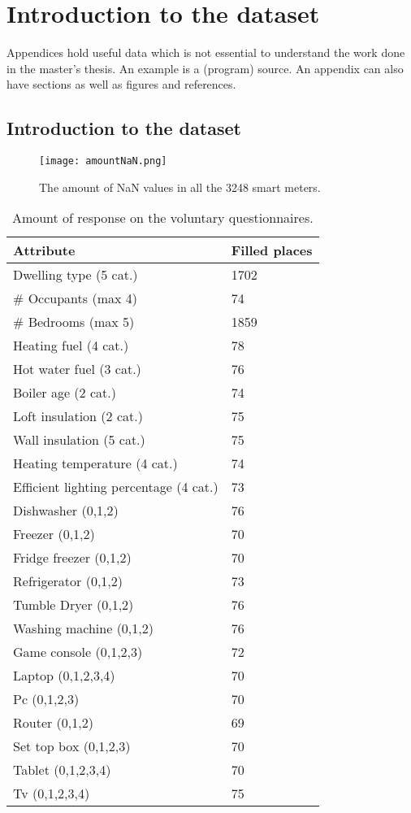 \chapter{Introduction to the dataset}
\label{app:A}
Appendices hold useful data which is not essential to understand the work
done in the master's thesis. An example is a (program) source.
An appendix can also have sections as well as figures and references\cite{h2g2}.

\section{Introduction to the dataset}

\begin{figure}[h!]
	\centering
	\texttt{[image: amountNaN.png]}
	\caption{The amount of NaN values in all the 3248 smart meters.}
	\label{fig:amountNaN}
\end{figure}

\begin{table}[h]
	\centering
	\begin{tabular}{|p{6cm}|p{2.5cm}|}
		\hline
		\textbf{Attribute} & \textbf{Filled places}\\ \hline	
		Dwelling type (5 cat.)  & 1702\\ \hline
		\# Occupants (max 4) & 74\\ \hline
		\# Bedrooms (max 5) & 1859\\ \hline
		Heating fuel (4 cat.) & 78\\ \hline
		Hot water fuel (3 cat.) & 76\\ \hline
		Boiler age (2 cat.) & 74\\ \hline
		Loft insulation (2 cat.)& 75\\ \hline
		Wall insulation (5 cat.)& 75\\ \hline
		Heating temperature (4 cat.) & 74\\ \hline
		Efficient lighting percentage (4 cat.) & 73\\ \hline
		Dishwasher (0,1,2) & 76\\ \hline
		Freezer (0,1,2)& 70\\ \hline
		Fridge freezer (0,1,2)& 70\\ \hline
		Refrigerator (0,1,2)& 73\\ \hline
		Tumble Dryer (0,1,2)& 76\\ \hline
		Washing machine (0,1,2)& 76\\ \hline
		Game console (0,1,2,3)&72\\ \hline
		Laptop (0,1,2,3,4)& 70\\ \hline
		Pc (0,1,2,3)& 70\\ \hline
		Router (0,1,2)& 69\\ \hline
		Set top box (0,1,2,3)& 70\\ \hline
		Tablet (0,1,2,3,4)& 70\\ \hline
		Tv (0,1,2,3,4)& 75\\ \hline
		
	\end{tabular}
	\caption{Amount of response on the voluntary questionnaires. }
	\label{tab:attributes}
\end{table}

